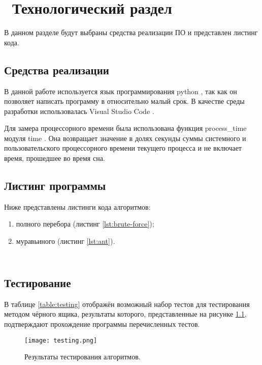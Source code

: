 \chapter{ Технологический раздел}
\label{cha:technological}

    В данном разделе будут выбраны средства реализации ПО и представлен листинг кода. 

    \section{Средства реализации}
        В данной работе используется язык программирования python \cite{python}, так как
        он позволяет написать программу в относительно малый срок.
        В качестве среды разработки использовалась Visual Studio Code \cite{visual-studio-code}. 

        Для замера процессорного времени была использована функция process\_time модуля time \cite{process_time}. 
        Она возвращает значение в долях секунды суммы системного и пользовательского процессорного времени текущего процесса и 
        не включает время, прошедшее во время сна.

    \section{Листинг программы}
        Ниже представлены листинги кода алгоритмов:
        \begin{enumerate}
            \item полного перебора (листинг \ref{lst:brute-force});
            \item муравьиного (листинг \ref{lst:ant}).
        \end{enumerate}
        
        \begin{lstlisting}[language=python, label=lst:brute-force, caption=Реализация алгоритма поиска полным перебором]

        \end{lstlisting}

        \begin{lstlisting}[language=python, label=lst:ant, caption=Реализация муравьиного алгоритма]

        \end{lstlisting}
    
        
    \section{Тестирование}
        В таблице \ref{table:testing} отображён возможный набор тестов
        для тестирования методом чёрного ящика, результаты которого, 
        представленные на рисунке \ref{png:testing:result}, подтверждают
        прохождение программы перечисленных тестов.
        
        \begin{figure}[h!]
            \centering
            \texttt{[image: testing.png]}
            \caption{Результаты тестирования алгоритмов.}
            \label{png:testing:result}
        \end{figure}
\newpage
